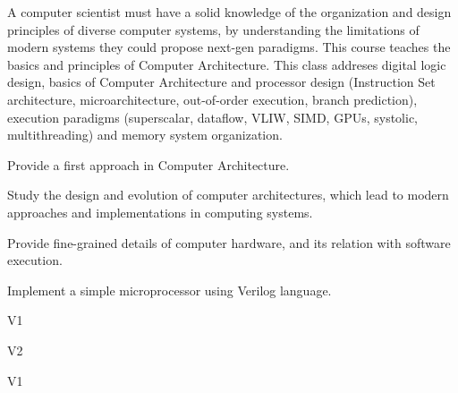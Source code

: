 \begin{syllabus}


\begin{justification}
  A computer scientist must have a solid knowledge of the organization and design principles of diverse computer systems, by understanding the limitations of modern systems they could propose next-gen paradigms.
  This course teaches the basics and principles of Computer Architecture.  This class addreses digital logic design, basics of Computer Architecture and processor design (Instruction Set architecture, microarchitecture, out-of-order execution, branch prediction), execution paradigms (superscalar, dataflow, VLIW, SIMD, GPUs, systolic, multithreading) and memory system organization.
\end{justification}

\begin{goals}
  \item Provide a first approach in Computer Architecture.
  \item Study the design and evolution of computer architectures, which lead to modern approaches and implementations in computing systems. 
  \item Provide fine-grained details of computer hardware, and its relation with software execution.
  \item Implement a simple microprocessor using Verilog language.
\end{goals}

\begin{outcomes}{V1}
    \item {}
    \item {}
    \item {}
\end{outcomes}

\begin{outcomes}{V2}
    \item {}
    \item {}
\end{outcomes}

\begin{competences}{V1}
    \item {} 
    \item {}
    \item {}
\end{competences}


\end{syllabus}
